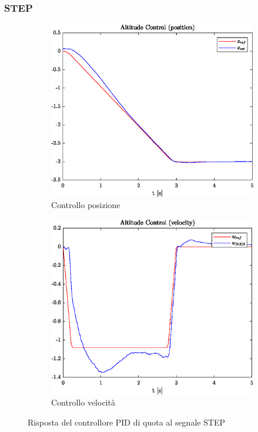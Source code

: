 \subsubsection{STEP}
\begin{figure}
	\centering
	\begin{subfigure}{0.45\textwidth}
		\centering
		\includegraphics[width=1\textwidth]{Simulazioni/Figure/PID/STEP/AltitudeControlPos}
		\caption{Controllo posizione}
	\end{subfigure}
	\hfill
	\begin{subfigure}{0.45\textwidth}
		\centering
		\includegraphics[width=1\textwidth]{Simulazioni/Figure/PID/STEP/AltitudeControlVel}
		\caption{Controllo velocità}
	\end{subfigure}
	\caption{Risposta del controllore PID di quota al segnale STEP}
\end{figure}


